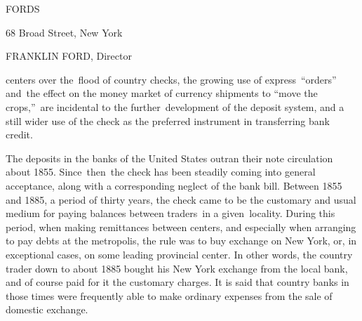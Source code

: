 \documentclass[twoside,symmetric,nobib,justified]{tufte-book}
\begin{document}
\vspace{.2in}

\begin{LARGE}


\end{LARGE}

\vspace{0.5in}

\begin{center}
    

{\huge FORDS}

\vspace{0.2in}

{\LARGE 68 Broad Street, New York}

\vspace{0.2in}

{\large FRANKLIN FORD, Director}

\end{center}


\vspace{.35in}


\vspace{.01in}
\hspace{0.25in}{\bfseries\Large No. 2}

\vspace{0.2in}


 centers over the~flood of country checks, the
growing use of express~``orders''~ and~the effect on the money market of
currency shipments to ``move the crops,''~are incidental to the
further~development of the deposit system, and a still wider use of the
check as the preferred instrument in transferring bank credit.~

The deposits in the banks of the United States outran their note
circulation about 1855. Since~then~the check has been steadily coming
into general acceptance, along with a corresponding neglect of the bank
bill. Between 1855 and 1885, a period of thirty years, the check came to
be the customary and usual medium for paying balances between traders~in
a given~locality. During this period, when making remittances between
centers, and especially when arranging to pay debts at the metropolis,
the rule was to buy exchange on New York, or, in exceptional cases, on
some leading provincial center. In other words, the country trader down
to about 1885 bought his New York exchange from the local bank, and of
course paid for it the customary charges. It is said that country banks
in those times were frequently able to make ordinary expenses from the
sale of domestic exchange. ~
\end{document}
